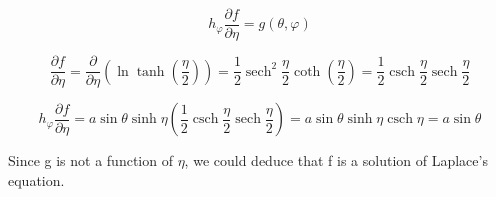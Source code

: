 \documentclass[12pt]{article}
\DeclareMathOperator{\sech}{sech}
\DeclareMathOperator{\csch}{csch}
\begin{document}
\[
    h_\varphi \frac{\partial f}{\partial \eta} = g(\theta, \varphi)
\]

\[
    \frac{\partial f}{\partial \eta}
    = \frac{\partial}{\partial \eta}\left(\ln \tanh \left(\frac{\eta}{2}\right)\right)
    = \frac{1}{2} \sech^2 \frac{\eta}{2} \coth \left(\frac{\eta}{2}\right)
    = \frac{1}{2} \csch \frac{\eta}{2} \sech \frac{\eta}{2}
\]

\[
    h_\varphi \frac{\partial f}{\partial \eta}
    = a \sin \theta \sinh \eta \left(\frac{1}{2} \csch \frac{\eta}{2} \sech \frac{\eta}{2}\right)
    = a \sin \theta \sinh \eta \csch \eta
    = a \sin \theta
\]

Since g is not a function of \(\eta \), we could deduce that f is a solution of Laplace's equation.

\newpage


\nocite{El-Deeb_PEU-218_Assignments}
\end{document}
